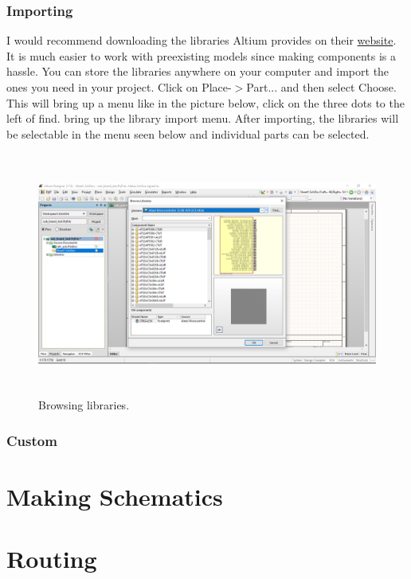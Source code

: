 \documentclass{article}
\begin{document}
	\subsubsection{Importing}
	I would recommend downloading the libraries Altium provides on their \href{http://techdocs.altium.com/display/ADOH/Download+Libraries}{website}. It is much easier to work with preexisting models since making components is a hassle. You can store the libraries anywhere on your computer and import the ones you need in your project. Click on Place-$>$Part... and then select Choose. This will bring up a menu like in the picture below, click on the three dots to the left of find. bring up the library import menu. After importing, the libraries will be selectable in the menu seen below and individual parts can be selected.
	\begin{figure}[H]	
		\centering
		\includegraphics[width=16cm, height=8cm]{library.png}
		\caption{Browsing libraries.}
		\label{fig 7}
	\end{figure}

	\subsubsection{Custom}
	\newpage
	\section{Making Schematics}
	\section{Routing}
	
\end{document}
